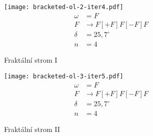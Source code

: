 \begin{figure}[p]
    \centering
    \texttt{[image: bracketed-ol-2-iter4.pdf]}
    \begin{align*}
        \omega&=F\\
        F&\to F[+F]F[-F]F\\
        \delta&=25{,}7^\circ\\
        n&=4
    \end{align*}
    \caption{Fraktální strom I}
    \label{fig:lsystem-fraktalni-strom-i}
\end{figure}
\begin{figure}[p]
    \centering
    \texttt{[image: bracketed-ol-3-iter5.pdf]}
    \begin{align*}
        \omega&=F\\
        F&\to F[+F]F[-F]F\\
        \delta&=25{,}7^\circ\\
        n&=4
    \end{align*}
    \caption{Fraktální strom II}
    \label{fig:lsystem-fraktalni-strom-ii}
\end{figure}
